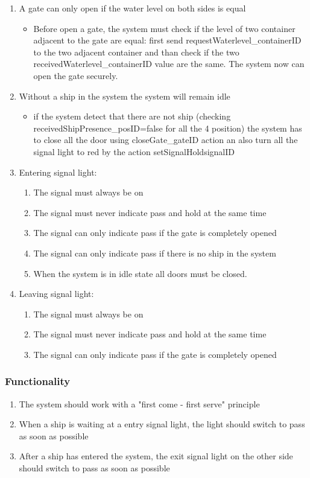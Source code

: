 \begin{enumerate}
\begin{itemize}
	\end{itemize}
	
	\item A gate can only open if the water level on both sides is equal
	\begin{itemize}
		\item Before open a gate, the system must check if the level of two container adjacent to the gate are equal: first send requestWaterlevel\_containerID to the two adjacent container and than check if the two receivedWaterlevel\_containerID value are the same. The system now can open the gate securely.
	\end{itemize}
	
	\item Without a ship in the system the system will remain idle
	\begin{itemize}
		\item if the system detect that there are not ship (checking receivedShipPresence\_posID=false for all the 4 position) the system has to close all the door using closeGate\_gateID action an also turn all the signal light to red by the action setSignalHold\-signalID
	\end{itemize}
	
	
	\item Entering signal light:
		\begin{enumerate}
			\item The signal must always be on
			\item The signal must never indicate pass and hold at the same time
			\item The signal can only indicate pass if the gate is completely opened
			\item The signal can only indicate pass if there is no ship in the system
			\item When the system is in idle state all doors must be closed.
			
		\end{enumerate}
	\item Leaving signal light:
		\begin{enumerate}
			\item The signal must always be on
			\item The signal must never indicate pass and hold at the same time
			\item The signal can only indicate pass if the gate is completely opened
		\end{enumerate}
\end{enumerate}
\subsubsection*{Functionality}
\begin{enumerate}
	\item The system should work with a "first come - first serve" principle
	\item When a ship is waiting at a entry signal light, the light should switch to pass as soon as possible
	\item After a ship has entered the system, the exit signal light on the other side should switch to pass as soon as possible
\end{enumerate}
